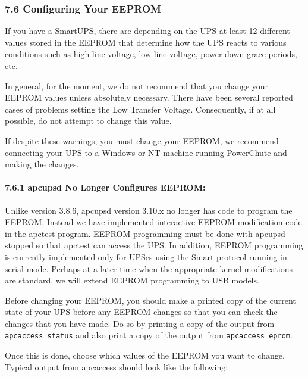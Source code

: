 \label{Configuring-Your-EEPROM}

\subsubsection*{7.6 Configuring Your EEPROM}

\label{index-eeprom_002c-configuring-140}
\label{index-Configuring_002c-eeprom-141}
If you have a SmartUPS, there are depending on the UPS at least 12 different
values stored in the EEPROM that determine how the UPS reacts to various
conditions such as high line voltage, low line voltage, power down grace
periods, etc.  

In general, for the moment, we do not recommend that you change your EEPROM
values unless absolutely necessary. There have been several reported cases of
problems setting the Low Transfer Voltage. Consequently, if at all possible,
do not attempt to change this value.  

If despite these warnings, you must change your EEPROM, we recommend
connecting your UPS to a Windows or NT machine running PowerChute and making
the changes. 

\label{apcupsd-No-Longer-Configures-EEPROM}

\paragraph*{7.6.1 apcupsd No Longer Configures EEPROM:}

Unlike version 3.8.6, apcupsd version 3.10.x no longer has code to program the
EEPROM. Instead we have implemented interactive EEPROM modification code in
the apctest program. EEPROM programming must be done with apcupsd stopped so
that apctest can access the UPS. In addition, EEPROM programming is currently
implemented only for UPSes using the Smart protocol running in serial mode.
Perhaps at a later time when the appropriate kernel modifications are
standard, we will extend EEPROM programming to USB models.  

Before changing your EEPROM, you should make a printed copy of the current
state of your UPS before any EEPROM changes so that you can check the changes
that you have made. Do so by printing a copy of the output from {\tt apcaccess
status} and also print a copy of the output from {\tt apcaccess eprom}.  

Once this is done, choose which values of the EEPROM you want to change.
Typical output from apcaccess should look like the following: 

